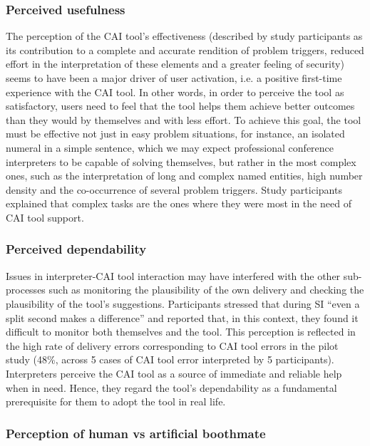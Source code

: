 \subsubsection{Perceived usefulness}

The perception of the CAI tool’s effectiveness (described by study participants as its contribution to a complete and accurate rendition of problem triggers, reduced effort in the interpretation of these elements and a greater feeling of security) seems to have been a major driver of user activation, i.e. a positive first-time experience with the CAI tool. In other words, in order to perceive the tool as satisfactory, users need to feel that the tool helps them achieve better outcomes than they would by themselves and with less effort. To achieve this goal, the tool must be effective not just in easy problem situations, for instance, an isolated numeral in a simple sentence, which we may expect professional conference interpreters to be capable of solving themselves, but rather in the most complex ones, such as the interpretation of long and complex named entities, high number density and the co-occurrence of several problem triggers. Study participants explained that complex tasks are the ones where they were most in the need of CAI tool support.




\subsubsection{Perceived dependability}

Issues in interpreter-CAI tool interaction may have interfered with the other sub-processes such as monitoring the plausibility of the own delivery and checking the plausibility of the tool’s suggestions. Participants stressed that during SI ``even a split second makes a difference'' and reported that, in this context, they found it difficult to monitor both themselves and the tool. This perception is reflected in the high rate of delivery errors corresponding to CAI tool errors in the pilot study (48\%, across 5 cases of CAI tool error interpreted by 5 participants). Interpreters perceive the CAI tool as a source of immediate and reliable help when in need. Hence, they regard the tool’s dependability as a fundamental prerequisite for them to adopt the tool in real life.

\subsubsection{Perception of human vs artificial boothmate}


